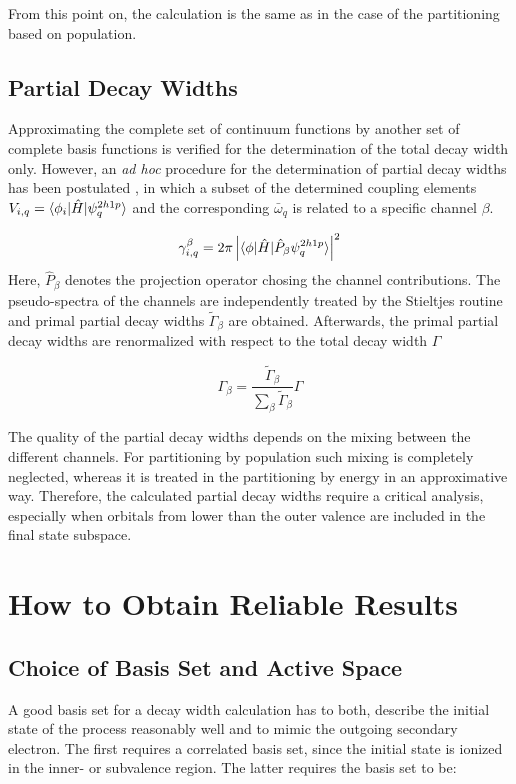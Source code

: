 From this point on, the calculation is the same as in the case of the partitioning
based on population.

\subsection{Partial Decay Widths} \label{section:partial}
Approximating the complete set of continuum functions 
by another set of complete basis functions is verified for
the determination of the total decay width only. However, an \emph{ad hoc} procedure
for the determination of partial decay widths has been postulated \cite{Cacelli86},
in which a subset of the determined coupling elements
$V_{i,q} = \braket{\phi_i |\hat{H}| \psi_{q}^{2h1p}}$  and the corresponding
$\bar{\omega}_q$ is related to a specific channel $\beta$.

\begin{equation}
 \gamma_{i,q}^{\beta} = 2\pi \left| \braket{\phi| \hat{H} | \hat{P}_\beta \psi_{q}^{2h1p}} 
                    \right|^2
\end{equation}
Here, $\hat{P}_\beta$ denotes the projection operator chosing the channel contributions.
The pseudo-spectra of the channels are independently treated by the Stieltjes
routine and primal partial decay widths $\tilde{\Gamma}_\beta$ are obtained.
Afterwards, the primal partial decay widths
are renormalized with respect to the total decay width $\Gamma$

\begin{equation}
 \Gamma_\beta = \frac{\tilde{\Gamma}_\beta}{\sum_\beta \tilde{\Gamma}_\beta} \Gamma
\end{equation}

The quality of the partial decay widths depends on the mixing between the different
channels. For partitioning by population such mixing is completely neglected, whereas
it is treated in the partitioning by energy in an approximative way. Therefore,
the calculated partial decay widths require a critical analysis, especially when
orbitals from lower than the outer valence are included in the final state subspace.




\section{How to Obtain Reliable Results}
\subsection{Choice of Basis Set and Active Space}
A good basis set for a decay width calculation has to both,
describe the initial state of the process reasonably well and to mimic
the outgoing secondary electron. The first requires a correlated basis set, since
the initial state is ionized in the inner- or subvalence region.
The latter requires the basis set to be:



